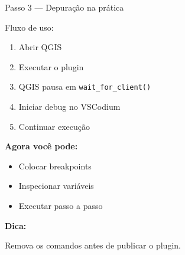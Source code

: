 \documentclass{beamer}
\begin{document}
\begin{frame}[fragile]{Passo 3 — Depuração na prática}
    
    Fluxo de uso:
    
    \begin{enumerate}
        \item Abrir QGIS
        \item Executar o plugin
        \item QGIS pausa em \texttt{wait\_for\_client()}
        \item Iniciar debug no VSCodium
        \item Continuar execução
    \end{enumerate}
    
    \vspace{0.4cm}
    
    \textbf{Agora você pode:}
    
    \begin{itemize}
        \item Colocar breakpoints
        \item Inspecionar variáveis
        \item Executar passo a passo
    \end{itemize}
    
    \vspace{0.4cm}
    
    \textbf{Dica:}
    
    Remova os comandos antes de publicar o plugin.
    
\end{frame}
\end{document}
